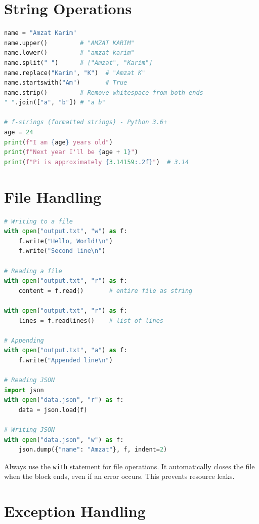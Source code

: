 \documentclass[12pt, a4paper, oneside]{book}
\begin{document}
\section{String Operations}

\begin{lstlisting}[language=Python, caption={String methods}]
name = "Amzat Karim"
name.upper()         # "AMZAT KARIM"
name.lower()         # "amzat karim"
name.split(" ")      # ["Amzat", "Karim"]
name.replace("Karim", "K")  # "Amzat K"
name.startswith("Am")       # True
name.strip()         # Remove whitespace from both ends
" ".join(["a", "b"]) # "a b"

# f-strings (formatted strings) - Python 3.6+
age = 24
print(f"I am {age} years old")
print(f"Next year I'll be {age + 1}")
print(f"Pi is approximately {3.14159:.2f}")  # 3.14
\end{lstlisting}

\section{File Handling}

\begin{lstlisting}[language=Python, caption={File I/O}]
# Writing to a file
with open("output.txt", "w") as f:
    f.write("Hello, World!\n")
    f.write("Second line\n")

# Reading a file
with open("output.txt", "r") as f:
    content = f.read()       # entire file as string

with open("output.txt", "r") as f:
    lines = f.readlines()    # list of lines

# Appending
with open("output.txt", "a") as f:
    f.write("Appended line\n")

# Reading JSON
import json
with open("data.json", "r") as f:
    data = json.load(f)

# Writing JSON
with open("data.json", "w") as f:
    json.dump({"name": "Amzat"}, f, indent=2)
\end{lstlisting}

\begin{tipbox}
Always use the \texttt{with} statement for file operations. It automatically closes the file when the block ends, even if an error occurs. This prevents resource leaks.
\end{tipbox}

\section{Exception Handling}
\end{document}
